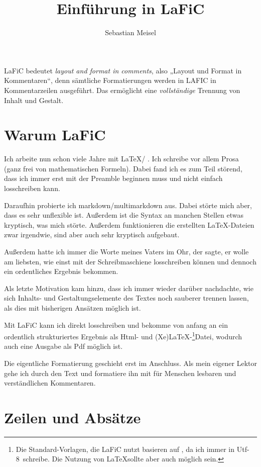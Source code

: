 \documentclass{scrartcl}
\title{Einführung in LaFiC}
\author{Sebastian Meisel}
\begin{document}
\maketitle


LaFiC bedeutet \textit{layout and format in comments}, also „Layout
und Format in Kommentaren“, denn sämtliche Formatierungen
werden in LAFIC in Kommentarzeilen ausgeführt. Das
ermöglicht eine \emph{vollständige} Trennung von Inhalt und
Gestalt.

\section{Warum LaFiC}

Ich arbeite nun schon viele Jahre mit \LaTeX / \XeLaTeX. Ich schreibe vor allem Prosa (ganz frei von mathematischen Formeln). Dabei fand ich es zum Teil störend, dass ich immer erst mit der Preamble beginnen muss und nicht einfach losschreiben kann.

Daraufhin probierte ich markdown/multimarkdown aus. Dabei störte mich aber, dass es sehr unflexible ist. Außerdem ist die Syntax an manchen Stellen etwas kryptisch, was mich störte. Außerdem funktionieren die erstellten \LaTeX-Dateien zwar irgendwie, sind aber auch sehr kryptisch aufgebaut.

Außerdem hatte ich immer die Worte meines Vaters im Ohr, der sagte, er wolle am liebsten, wie einst mit der Schreibmaschiene losschreiben können und dennoch ein ordentliches Ergebnis bekommen.

Als letzte Motivation kam hinzu, dass ich immer wieder darüber nachdachte, wie sich Inhalts- und Gestaltungselemente des Textes noch sauberer trennen lassen, als dies mit bisherigen Ansätzen möglich ist.

Mit LaFiC kann ich direkt losschreiben und bekomme von anfang an ein ordentlich strukturiertes Ergebnis als Html- und (Xe)LaTeX-\footnote{Die Standard-Vorlagen, die LaFiC nutzt basieren auf \XeLaTeX, da ich immer in Utf-8~schreibe. Die Nutzung von \LaTeX sollte aber auch möglich sein.}Datei, wodurch auch  eine Ausgabe als Pdf möglich ist.

Die eigentliche Formatierung geschieht erst im Anschluss. Als mein eigener Lektor gehe ich durch den Text und formatiere ihn mit für Menschen lesbaren und verständlichen Kommentaren.

\section{Zeilen und Absätze}
\end{document}
